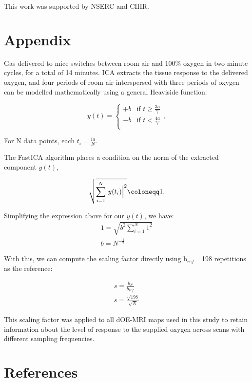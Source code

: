 \documentclass[num-refs]{wiley-article}
\begin{document}
This work was supported by NSERC and CIHR.

\section{Appendix}
Gas delivered to mice switches between room air and 100\% oxygen in two minute cycles, for a total of 14 minutes.
ICA extracts the tissue response to the delivered oxygen, and four periods of room air interspersed with three periods of oxygen can be modelled mathematically using a general Heaviside function:

\begin{equation}
y(t) =
  \begin{cases}
                                   +b & \text{if $t\geq \frac{3a}{7}$} \\
                                   -b & \text{if $t< \frac{4a}{7}$} \\
  \end{cases},
\end{equation}

For N data points, each $t_i = \frac{ia}{N}$.

The FastICA algorithm places a condition on the norm of the extracted component $y(t)$,

\begin{equation}
\sqrt{\sum_{i=1}^{N} \Bigl|y(t_i)\Bigr|^2} \coloneqq 1.
\end{equation}

Simplifying the expression above for our $y(t)$, we have:
\begin{align}
1 = \sqrt{b^2 \sum_{i=1}^{N} 1^2} \nonumber \\
b = N^{-\frac{1}{2}}
\end{align}

With this, we can compute the scaling factor directly using b$_{ref}$ =198 repetitions as the reference:

\begin{align}
s = \frac{b_{N}}{b_{ref}} \nonumber \\
s = \frac{\sqrt{198}}{\sqrt{N}} 
\end{align}

This scaling factor was applied to all dOE-MRI maps used in this study to retain information about the level of response to the supplied oxygen across scans with different sampling frequencies.

 \section{References}


%
\end{document}
